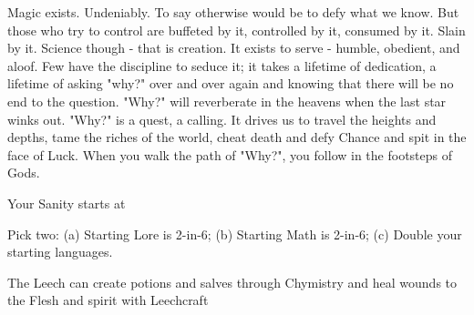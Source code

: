 {{{    }
  }

  \setcounter{footnote}{0}



  Magic exists.  Undeniably.  To say otherwise would be to defy what we know.  But those who try to control  are buffeted by it, controlled by it, consumed by it.  Slain by it.  Science though - that is  creation.  It exists to serve - humble, obedient, and aloof.  Few have the discipline to seduce it; it takes a lifetime of dedication, a lifetime of asking "why?" over and over again and knowing that there will be no end to the question.  "Why?" will reverberate in the heavens when the last star winks out.  "Why?" is a quest, a calling.  It drives us to travel the heights and depths, tame the riches of the world, cheat death and defy Chance and spit in the face of Luck.  When you walk the path of "Why?", you follow in the footsteps of Gods.


  
  Your Sanity starts at \DCUP

  Pick two:  (a) Starting Lore is 2-in-6; (b) Starting Math is 2-in-6; (c) Double your starting languages.



  The Leech can create potions and salves through Chymistry and heal wounds to the Flesh and spirit with Leechcraft\footnotemark

}
